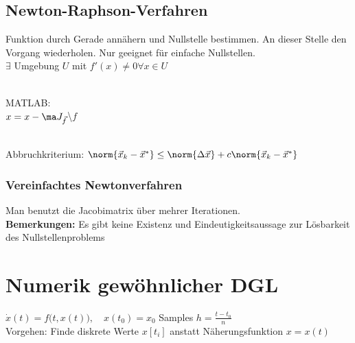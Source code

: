 \documentclass[fs, footer]{latex4ei}
\begin{document}
\begin{sectionbox}
\begin{sectionbox}
\begin{sectionbox}
	\subsection{Newton-Raphson-Verfahren}
	Funktion durch Gerade annähern und Nullstelle bestimmen. An dieser Stelle den Vorgang wiederholen.
	Nur geeignet für einfache Nullstellen.\\
	$\exists$ Umgebung $U$ mit $f'(x) \ne 0 \forall x \in U$\\
	 \\
	 \qquad
	\parbox{4cm}{MATLAB: \\ $x = x - \ma J_{\vec f}$\textbackslash $f$}\\
	Abbruchkriterium: $\norm{\vec x_k - \vec x^*} \le \norm{\Delta \vec x} + c \norm{\vec x_k - \vec x^*}$
	\subsubsection{Vereinfachtes Newtonverfahren}
	Man benutzt die Jacobimatrix über mehrer Iterationen. \\
	\textbf{Bemerkungen:} Es gibt keine Existenz und Eindeutigkeitsaussage zur Lösbarkeit des Nullstellenproblems \\ 
\end{sectionbox}

\section{Numerik gewöhnlicher DGL}
$\dot x(t) = f\big(t,x(t)\big),\quad x(t_0) = x_0$ \qquad Samples $h = \frac{t-t_0}{n}$\\
Vorgehen: Finde diskrete Werte $x[t_i]$ anstatt Näherungsfunktion $x = x(t)$\\

\begin{sectionbox}

\end{sectionbox}
\end{sectionbox}
\end{sectionbox}
\end{document}

